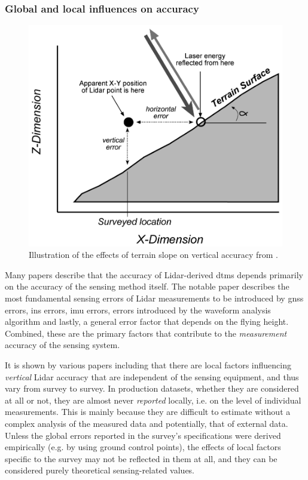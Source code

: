 \subsubsection{Global and local influences on accuracy}

\begin{figure}
    \includegraphics[width=0.95\linewidth]{final_report/figs/hodgson_breshanan_2004_01.png} 
    \caption{Illustration of the effects of terrain slope on vertical accuracy from \cite{hodgson_breshanan_2004}.}
    \label{fig:elevationaccuracy}
\end{figure}

Many papers describe that the accuracy of Lidar-derived \ac{dtm}s depends primarily on the accuracy of the sensing method itself. The notable paper \cite{hodgson_breshanan_2004} describes the most fundamental sensing errors of Lidar measurements to be introduced by \ac{gnss} errors, \ac{ins} errors, \ac{imu} errors, errors introduced by the waveform analysis algorithm and lastly, a general error factor that depends on the flying height. Combined, these are the primary factors that contribute to the \textit{measurement} accuracy of the sensing system.

It is shown by various papers including \cite{hodgson_breshanan_2004, su_bork_2006, kraus_etal_2006, raber_etal_2007, peng_shih_2006, chow_hodgson_2009, aguilar_etal_2005, aguilar_etal_2010, guo_etal_2010} that there are local factors influencing \textit{vertical} Lidar accuracy that are independent of the sensing equipment, and thus vary from survey to survey. In production datasets, whether they are considered at all or not, they are almost never \textit{reported} locally, i.e. on the level of individual measurements. This is mainly because they are difficult to estimate without a complex analysis of the measured data and potentially, that of external data. Unless the global errors reported in the survey's specifications were derived empirically (e.g. by using ground control points), the effects of local factors specific to the survey may not be reflected in them at all, and they can be considered purely theoretical sensing-related values.

